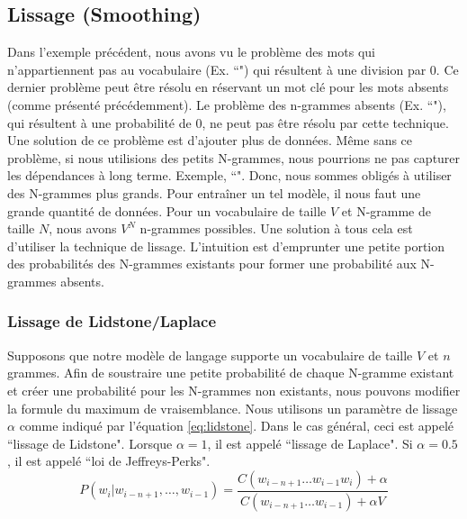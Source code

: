 \documentclass{KodeBook}
\begin{document}
\subsection{Lissage (Smoothing)}

Dans l'exemple précédent, nous avons vu le problème des mots qui n'appartiennent pas au vocabulaire (Ex. ``") qui résultent à une division par $0$. 
Ce dernier problème peut être résolu en réservant un mot clé pour les mots absents (comme présenté précédemment).
Le problème des n-grammes absents (Ex. ``"), qui résultent à une probabilité de $0$, ne peut pas être résolu par cette technique. 
Une solution de ce problème est d'ajouter plus de données.
Même sans ce problème, si nous utilisions des petits N-grammes, nous pourrions ne pas capturer les dépendances à long terme. 
Exemple, ``". 
Donc, nous sommes obligés à utiliser des N-grammes plus grands. 
Pour entraîner un tel modèle, il nous faut une grande quantité de données. 
Pour un vocabulaire de taille $V$ et N-gramme de taille $N$, nous avons $V^N$ n-grammes possibles.
Une solution à tous cela est d'utiliser la technique de lissage.
L'intuition est d'emprunter une petite portion des probabilités des N-grammes existants pour former une probabilité aux N-grammes absents.

\subsubsection{Lissage de Lidstone/Laplace}

Supposons que notre modèle de langage supporte un vocabulaire de taille $V$ et $n$ grammes.
Afin de soustraire une petite probabilité de chaque N-gramme existant et créer une probabilité pour les N-grammes non existants, nous pouvons modifier la formule du maximum de vraisemblance.
Nous utilisons un paramètre de lissage $\alpha$ comme indiqué par l'équation \ref{eq:lidstone}.
Dans le cas général, ceci est appelé ``lissage de Lidstone". 
Lorsque $\alpha = 1$, il est appelé ``lissage de Laplace". 
Si $\alpha = 0.5$, il est appelé ``loi de Jeffreys-Perks".
\begin{equation}
	P(w_i | w_{i-n+1}, \ldots, w_{i-1}) = \frac{C(w_{i-n+1} \ldots w_{i-1} w_i) + \alpha}{C(w_{i-n+1} \ldots w_{i-1}) + \alpha V}
	\label{eq:lidstone}
\end{equation}
\end{document}
